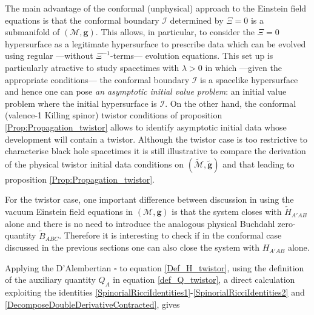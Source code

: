 \documentclass[10pt,a4paper]{article}
\theoremstyle{plain}
\def\bmg{{\bm g}}
\begin{document}
{The main advantage of the conformal (unphysical) approach to the
Einstein field equations is that the conformal boundary $\mathscr{I}$
determined by $\Xi=0$ is a submanifold of $(\mathcal{M},\bmg)$. This
allows, in particular, to consider the $\Xi=0$ hypersurface as a
legitimate hypersurface to prescribe data which can be evolved using
regular ---without $\Xi^{-1}$-terms--- evolution equations.  This set up is
particularly atractive to study spacetimes with $\lambda>0$ in which
---given the appropriate conditions--- the conformal boundary $\mathscr{I}$
is a spacelike hypersurface and hence one can pose \emph{an asymptotic
initial value problem}: an initial value problem where the initial
hypersurface is $\mathscr{I}$.
On the other hand, the conformal (valence-1 Killing spinor) twistor conditions
of proposition \eqref{Prop:Propagation_twistor} allows to identify
asymptotic initial data  whose development will
contain a twistor. Although the twistor case is too restrictive to
characterise black hole spacetimes
it is still illustrative to compare the derivation of the physical
twistor initial data conditions on
$(\tilde{\mathcal{M}},\tilde{\bmg})$ and that leading to proposition
\eqref{Prop:Propagation_twistor}.

For the twistor case, one important difference between discussion in
\cite{GasVal15} using the vacuum Einstein field equations in  $(\mathcal{M},\bmg)$
is that the system closes with $\tilde{H}_{A'AB}$ alone and there is no need
to introduce the analogous physical Buchdahl zero-quantity $\tilde{B}_{ABC}$.
Therefore it is interesting to check if in the conformal case discussed
in the previous sections one can also close the system with $H_{A'AB}$ alone.

Applying the D'Alembertian $\square$ to equation
\eqref{Def_H_twistor}, using the definition of the auxiliary quantity
$Q_A$ in equation \eqref{def_Q_twistor}, a direct calculation exploiting the
identities \eqref{SpinorialRicciIdentities1}-\eqref{SpinorialRicciIdentities2}
and \eqref{DecomposeDoubleDerivativeContracted}, gives

}
\end{document}
